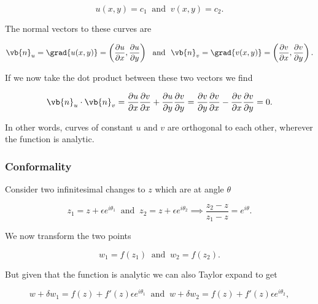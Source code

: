 \documentclass[english,a4paper,12pt]{report}
\begin{document}
\begin{equation}
    u(x,y) = c_1 ~\text { and }~ v(x,y) = c_2.
\end{equation}

The normal vectors to these curves are 

\begin{equation}
    \vb{n} _{u} = \grad{u(x,y)} = \left( \frac{\partial u}{\partial x} , \frac{\partial u}{\partial y}  \right) ~\text { and }~ \vb{n} _{v} = \grad{v(x,y)} = \left( \frac{\partial v}{\partial x} , \frac{\partial v}{\partial y}  \right).
\end{equation}

If we now take the dot product between these two vectors we find 

\begin{equation}
    \vb{n} _{u} \cdot \vb{n} _{v} = \frac{\partial u}{\partial x} \frac{\partial v}{\partial x} + \frac{\partial u}{\partial y}  \frac{\partial v}{\partial y} = \frac{\partial v}{\partial y} \frac{\partial v}{\partial x} - \frac{\partial v}{\partial x} \frac{\partial v}{\partial y} =0.  
\end{equation}

In other words, curves of constant \(u \text { and } v\) are orthogonal to each other, wherever the function is analytic.

\subsubsection{Conformality}

Consider two infinitesimal changes to \(z\)  which are at angle \(\theta \)

\begin{equation}
    z_1 = z+ \epsilon e^{i \theta _{1} } ~\text { and }~ z_2 = z+ \epsilon e^{i \theta _{2} } \implies \frac{z_2 -z}{z_1 -z} = e^{i \theta }.    
\end{equation}

We now transform the two points 

\begin{equation}
    w_{1} = f(z_1 ) ~\text { and }~ w_{2} = f(z_2 ).  
\end{equation}

But given that the function is analytic we can also Taylor expand to get 

\begin{equation}
    w+\delta w_1 = f(z) + f'(z)\epsilon e^{i \theta _{1} } ~\text { and }~ w+\delta w_2 = f(z) + f'(z)\epsilon  e^{i \theta _{2} },
\end{equation}
\end{document}
